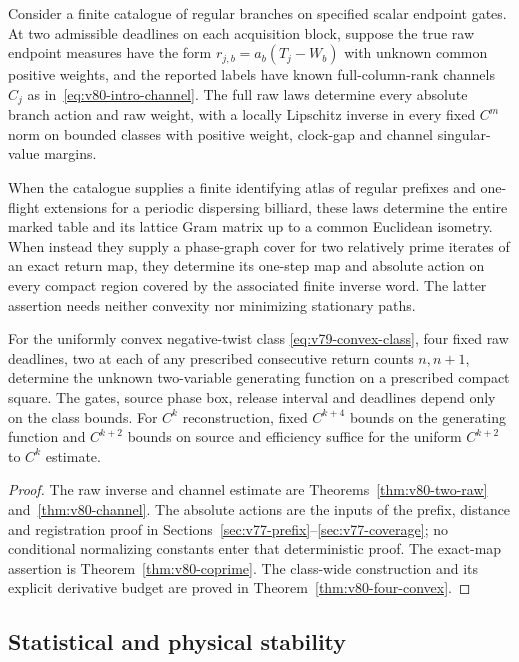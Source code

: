 \begin{theorem}\label{thm:v80-main}
Consider a finite catalogue of regular branches on specified scalar
endpoint gates.  At two admissible deadlines on each acquisition block,
suppose the true raw endpoint measures have the form
$r_{j,b}=a_b(T_j-W_b)$ with unknown common positive weights, and the
reported labels have known full-column-rank channels $C_j$ as
in~\eqref{eq:v80-intro-channel}.  The full raw laws determine every
absolute branch action and raw weight, with a locally Lipschitz inverse
in every fixed $C^m$ norm on bounded classes with positive weight,
clock-gap and channel singular-value margins.

When the catalogue supplies a finite identifying atlas of regular
prefixes and one-flight extensions for a periodic dispersing billiard,
these laws determine the entire marked table and its lattice Gram
matrix up to a common Euclidean isometry.  When instead they supply a
phase-graph cover for two relatively prime iterates of an exact return
map, they determine its one-step map and absolute action on every
compact region covered by the associated finite inverse word.
The latter assertion needs neither convexity nor minimizing stationary
paths.

For the uniformly convex negative-twist class
\eqref{eq:v79-convex-class}, four fixed raw deadlines, two at each of
any prescribed consecutive return counts $n,n+1$, determine the unknown
two-variable generating function on a prescribed compact square.
The gates, source phase box, release interval and deadlines depend
only on the class bounds.  For $C^k$ reconstruction, fixed $C^{k+4}$
bounds on the generating function and $C^{k+2}$ bounds on source and
efficiency suffice for the uniform $C^{k+2}$ to $C^k$ estimate.
\end{theorem}
\begin{proof}
The raw inverse and channel estimate are
Theorems~\ref{thm:v80-two-raw} and~\ref{thm:v80-channel}.
The absolute actions are the inputs of the prefix, distance and
registration proof in Sections~\ref{sec:v77-prefix}--\ref{sec:v77-coverage};
no conditional normalizing constants enter that deterministic proof.
The exact-map assertion is Theorem~\ref{thm:v80-coprime}.
The class-wide construction and its explicit derivative budget are
proved in Theorem~\ref{thm:v80-four-convex}.
\end{proof}

\subsection{Statistical and physical stability}

